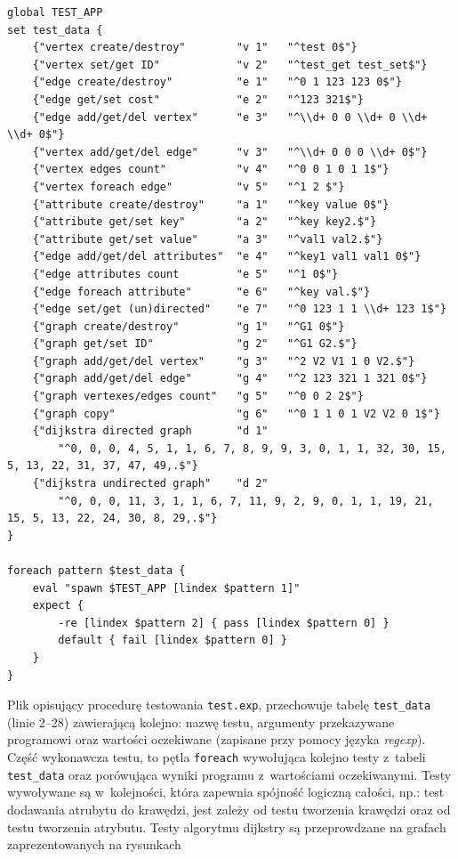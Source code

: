 \documentclass[a4paper,12pt,polish,oneside]{thesis}
\newcommand\code[1]{\lstinline[style=line]{#1}}
\begin{document}
\begin{lstlisting}[style=code,caption=Plik definicji testów jednostkowych platformy DejaGNU]
global TEST_APP
set test_data {
	{"vertex create/destroy"        "v 1"   "^test 0$"}
	{"vertex set/get ID"            "v 2"   "^test_get test_set$"}
	{"edge create/destroy"          "e 1"   "^0 1 123 123 0$"}
	{"edge get/set cost"            "e 2"   "^123 321$"}
	{"edge add/get/del vertex"      "e 3"   "^\\d+ 0 0 \\d+ 0 \\d+ \\d+ 0$"}
	{"vertex add/get/del edge"      "v 3"   "^\\d+ 0 0 0 \\d+ 0$"}
	{"vertex edges count"           "v 4"   "^0 0 1 0 1 1$"}
	{"vertex foreach edge"          "v 5"   "^1 2 $"}
	{"attribute create/destroy"     "a 1"   "^key value 0$"}
	{"attribute get/set key"        "a 2"   "^key key2.$"}
	{"attribute get/set value"      "a 3"   "^val1 val2.$"}
	{"edge add/get/del attributes"  "e 4"   "^key1 val1 val1 0$"}
	{"edge attributes count         "e 5"   "^1 0$"}
	{"edge foreach attribute"       "e 6"   "^key val.$"}
	{"edge set/get (un)directed"    "e 7"   "^0 123 1 1 \\d+ 123 1$"}
	{"graph create/destroy"         "g 1"   "^G1 0$"}
	{"graph get/set ID"             "g 2"   "^G1 G2.$"}
	{"graph add/get/del vertex"     "g 3"   "^2 V2 V1 1 0 V2.$"}
	{"graph add/get/del edge"       "g 4"   "^2 123 321 1 321 0$"}
	{"graph vertexes/edges count"   "g 5"   "^0 0 2 2$"}
	{"graph copy"                   "g 6"   "^0 1 1 0 1 V2 V2 0 1$"}
	{"dijkstra directed graph       "d 1"
		"^0, 0, 0, 4, 5, 1, 1, 6, 7, 8, 9, 9, 3, 0, 1, 1, 32, 30, 15, 5, 13, 22, 31, 37, 47, 49,.$"}
	{"dijkstra undirected graph"    "d 2"
		"^0, 0, 0, 11, 3, 1, 1, 6, 7, 11, 9, 2, 9, 0, 1, 1, 19, 21, 15, 5, 13, 22, 24, 30, 8, 29,.$"}
}

foreach pattern $test_data {
	eval "spawn $TEST_APP [lindex $pattern 1]"
	expect {
		-re [lindex $pattern 2] { pass [lindex $pattern 0] }
		default { fail [lindex $pattern 0] }
	}
}
\end{lstlisting}
Plik opisujący procedurę testowania \code{test.exp}, przechowuje tabelę \code{test_data} (linie 2--28) zawierającą kolejno: nazwę testu, argumenty przekazywane programowi oraz wartości oczekiwane (zapisane przy pomocy języka \emph{regexp}).
Część wykonawcza testu, to pętla \code{foreach} wywołująca kolejno testy z~tabeli \code{test_data} oraz porówująca wyniki programu z~wartościami oczekiwanymi.
Testy wywoływane są w~kolejności, która zapewnia spójność logiczną całości, np.: test dodawania atrubytu do krawędzi, jest zależy od testu tworzenia krawędzi oraz od testu tworzenia atrybutu.
Testy algorytmu dijkstry są przeprowdzane na grafach zaprezentowanych na rysunkach %
\end{document}
